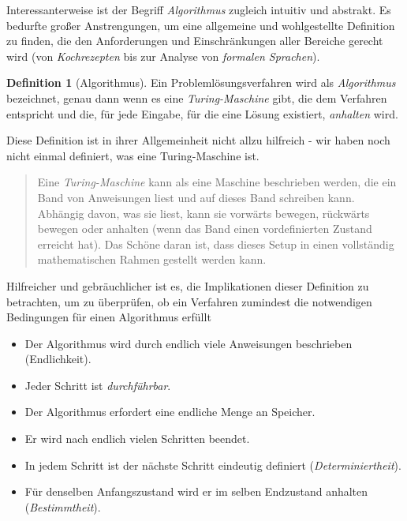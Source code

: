 \documentclass[
]{book}
\providecommand{\tightlist}{%
  \setlength{\itemsep}{0pt}\setlength{\parskip}{0pt}}
\newenvironment {JHSAYS} [0] {\begin{quote}\color{jhsc}} {\end{quote}}
\theoremstyle{definition}
\newtheorem{definition}{Definition}[chapter]
\theoremstyle{definition}
\theoremstyle{definition}
\theoremstyle{definition}
\theoremstyle{remark}
\begin{document}
Interessanterweise ist der Begriff \emph{Algorithmus} zugleich intuitiv und abstrakt. Es bedurfte großer Anstrengungen, um eine allgemeine und wohlgestellte Definition zu finden, die den Anforderungen und Einschränkungen aller Bereiche gerecht wird (von \emph{Kochrezepten} bis zur Analyse von \emph{formalen Sprachen}).

\begin{definition}[Algorithmus]
\protect\hypertarget{def:algorithm}{}\label{def:algorithm}Ein Problemlösungsverfahren wird als \emph{Algorithmus} bezeichnet, genau dann wenn es eine \emph{Turing-Maschine} gibt, die dem Verfahren entspricht und die, für jede Eingabe, für die eine Lösung existiert, \emph{anhalten} wird.
\end{definition}

Diese Definition ist in ihrer Allgemeinheit nicht allzu hilfreich - wir haben noch nicht einmal definiert, was eine Turing-Maschine ist.

\leavevmode{}%
\begin{JHSAYS}
Eine \emph{Turing-Maschine} kann als eine Maschine beschrieben werden, die ein Band von Anweisungen liest und auf dieses Band schreiben kann. Abhängig davon, was sie liest, kann sie vorwärts bewegen, rückwärts bewegen oder anhalten (wenn das Band einen vordefinierten Zustand erreicht hat). Das Schöne daran ist, dass dieses Setup in einen vollständig mathematischen Rahmen gestellt werden kann.

\end{JHSAYS}

Hilfreicher und gebräuchlicher ist es, die Implikationen dieser Definition zu betrachten, um zu überprüfen, ob ein Verfahren zumindest die notwendigen Bedingungen für einen Algorithmus erfüllt

\begin{itemize}
\tightlist
\item
  Der Algorithmus wird durch endlich viele Anweisungen beschrieben (Endlichkeit).
\item
  Jeder Schritt ist \emph{durchführbar}.
\item
  Der Algorithmus erfordert eine endliche Menge an Speicher.
\item
  Er wird nach endlich vielen Schritten beendet.
\item
  In jedem Schritt ist der nächste Schritt eindeutig definiert (\emph{Determiniertheit}).
\item
  Für denselben Anfangszustand wird er im selben Endzustand anhalten (\emph{Bestimmtheit}).
\end{itemize}
\end{document}
